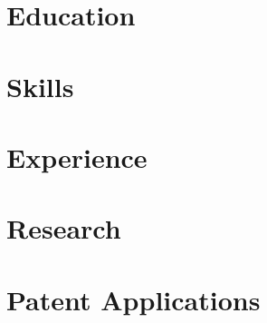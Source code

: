 \documentclass[letterpaper,11pt]{article}
\begin{document}


\section{Education}


\section{Skills}


\section{Experience}





\section{Research}


\section{Patent Applications}

\end{document}

